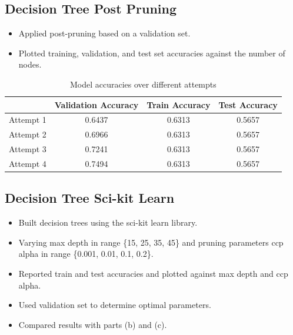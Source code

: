 \documentclass[12pt]{article}
\begin{document}
\subsection{Decision Tree Post Pruning}
    \begin{itemize}
        \item Applied post-pruning based on a validation set.
        \item Plotted training, validation, and test set accuracies against the number of nodes.
    \end{itemize}

    \begin{table}[ht]
\centering
\begin{tabular}{@{}lccc@{}}
\toprule
 & Validation Accuracy & Train Accuracy & Test Accuracy \\ 
\midrule
Attempt 1 & 0.6437 & 0.6313 & 0.5657 \\
Attempt 2 & 0.6966 & 0.6313 & 0.5657 \\
Attempt 3 & 0.7241 & 0.6313 & 0.5657 \\
Attempt 4 & 0.7494 & 0.6313 & 0.5657 \\
\bottomrule
\end{tabular}
\caption{Model accuracies over different attempts}
\label{tab:accuracies}
\end{table}



\subsection{Decision Tree Sci-kit Learn}
    \begin{itemize}
        \item Built decision trees using the sci-kit learn library.
        \item Varying max depth in range \{15, 25, 35, 45\} and pruning parameters ccp alpha in range \{0.001, 0.01, 0.1, 0.2\}.
        \item Reported train and test accuracies and plotted against max depth and ccp alpha.
        \item Used validation set to determine optimal parameters.
        \item Compared results with parts (b) and (c).
    \end{itemize}
\end{document}
